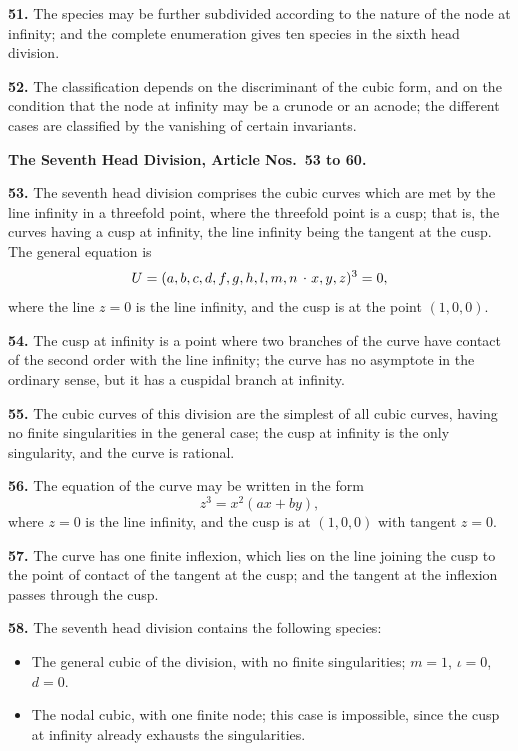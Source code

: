 \documentclass[11pt,a4paper]{article}
\theoremstyle{plain}
\theoremstyle{definition}
\newcommand{\lc}{\kern.17em\raise.5ex\hbox{.}\kern.08em}  %
\begin{document}
\textbf{51.} The species may be further subdivided according to the nature of the node at infinity; and the complete enumeration gives ten species in the sixth head division.

\textbf{52.} The classification depends on the discriminant of the cubic form, and on the condition that the node at infinity may be a crunode or an acnode; the different cases are classified by the vanishing of certain invariants.

\bigskip

\noindent\textbf{The Seventh Head Division, Article Nos.~53 to 60.}

\medskip

\textbf{53.} The seventh head division comprises the cubic curves which are met by the line infinity in a threefold point, where the threefold point is a cusp; that is, the curves having a cusp at infinity, the line infinity being the tangent at the cusp. The general equation is
\[
U = (a, b, c, d, f, g, h, l, m, n \mathbin{\lc} x, y, z)^3 = 0,
\]
where the line $z = 0$ is the line infinity, and the cusp is at the point $(1, 0, 0)$.

\textbf{54.} The cusp at infinity is a point where two branches of the curve have contact of the second order with the line infinity; the curve has no asymptote in the ordinary sense, but it has a cuspidal branch at infinity.

\textbf{55.} The cubic curves of this division are the simplest of all cubic curves, having no finite singularities in the general case; the cusp at infinity is the only singularity, and the curve is rational.

\textbf{56.} The equation of the curve may be written in the form
\[
z^3 = x^2(ax + by),
\]
where $z = 0$ is the line infinity, and the cusp is at $(1, 0, 0)$ with tangent $z = 0$.

\textbf{57.} The curve has one finite inflexion, which lies on the line joining the cusp to the point of contact of the tangent at the cusp; and the tangent at the inflexion passes through the cusp.

\textbf{58.} The seventh head division contains the following species:
\begin{itemize}
\item[(1)] The general cubic of the division, with no finite singularities; $m = 1$, $\iota = 0$, $d = 0$.
\item[(2)] The nodal cubic, with one finite node; this case is impossible, since the cusp at infinity already exhausts the singularities.
\end{itemize}
\end{document}
